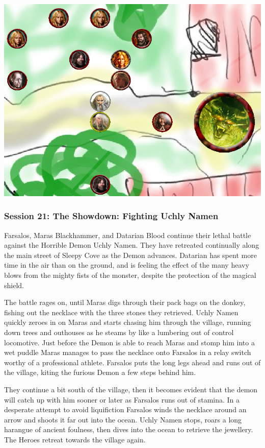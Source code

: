 \begin{center}
\vspace{0.5 cm}
\includegraphics[width=0.7\linewidth]{./figs/playthrough/battle-sleepy-cove.png}
\vspace{0.5 cm}
\end{center}


\subsubsection*{Session 21: The Showdown: Fighting Uchly Namen}
Farsalos, Maras Blackhammer, and Datarian Blood continue their lethal battle against the Horrible Demon Uchly Namen. They have retreated continually along the main street of Sleepy Cove as the Demon advances. Datarian has spent more time in the air than on the ground, and is feeling the effect of the many heavy blows from the mighty fists of the monster, despite the protection of the magical shield.

The battle rages on, until Maras digs through their pack bags on the donkey, fishing out the necklace with the three stones they retrieved. Uchly Namen quickly zeroes in on Maras and starts chasing him through the village, running down trees and outhouses as he steams by like a lumbering out of control locomotive. Just before the Demon is able to reach Maras and stomp him into a wet puddle Maras manages to pass the necklace onto Farsalos in a relay switch worthy of a professional athlete. Farsalos puts the long legs ahead and runs out of the village, kiting the furious Demon a few steps behind him.

They continue a bit south of the village, then it becomes evident that the demon will catch up with him sooner or later as Farsalos runs out of stamina. In a desperate attempt to avoid liquifiction Farsalos winds the necklace around an arrow and shoots it far out into the ocean. Uchly Namen stops, roars a long harangue of ancient foulness, then dives into the ocean to retrieve the jewellery. The Heroes retreat towards the village again.

